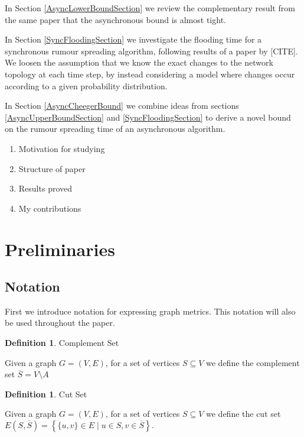 \documentclass[a4paper,11pt]{article}
\theoremstyle{definition}
\newtheorem{definition}[theorem]{Definition}
\newcommand*\comp[1]{\overline{#1}}
\begin{document}
In Section \ref{AsyncLowerBoundSection} we review the complementary result from the same paper that the asynchronous bound is almost tight.

In Section \ref{SyncFloodingSection} we investigate the flooding time for a synchronous rumour spreading algorithm, following results of a paper by [CITE]. We loosen the assumption that we know the exact changes to the network topology at each time step, by instead considering a model where changes occur according to a given probability distribution.

In Section \ref{AsyncCheegerBound} we combine ideas from sections \ref{AsyncUpperBoundSection} and \ref{SyncFloodingSection} to derive a novel bound on the rumour spreading time of an asynchronous algorithm. 


\begin{enumerate}
	\item Motivation for studying
	\item Structure of paper
	\item Results proved
	\item My contributions
\end{enumerate}

\section{Preliminaries}
\label{Prelims}

\subsection{Notation}

First we introduce notation for expressing graph metrics. This notation will also be used throughout the paper. %

\begin{definition}
	Complement Set

	\noindent
	Given a graph $G = (V, E)$, for a set of vertices $S \subseteq V$ we define the complement set $\comp{S} = V \setminus A$
\end{definition}

\begin{definition}
	Cut Set

	\noindent
	Given a graph $G = (V, E)$, for a set of vertices $S \subseteq V$ we define the cut set $ E(S, \comp{S}) = \left\{\{u, v\} \in E \mid u \in S, v \in \comp{S} \right\}.$
\end{definition}
\end{document}

